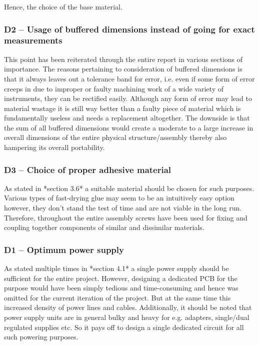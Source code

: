Hence, the choice of the base material.

\subsubsection*{D2 – Usage of buffered dimensions instead of going for exact measurements}

This point has been reiterated through the entire report in various sections of importance. The reasons pertaining to consideration of buffered dimensions is that it always leaves out a tolerance band for error, i.e. even if some form of error creeps in due to improper or faulty machining work of a wide variety of instruments, they can be rectified easily. Although any form of error may lead to material wastage it is still way better than a faulty piece of material which is fundamentally useless and needs a replacement altogether. The downside is that the sum of all buffered dimensions would create a moderate to a large increase in overall dimensions of the entire physical structure/assembly thereby also hampering its overall portability.

\subsubsection*{D3 – Choice of proper adhesive material}

As stated in *section 3.6* a suitable material should be chosen for such purposes. Various types of fast-drying glue may seem to be an intuitively easy option however, they don’t stand the test of time and are not viable in the long run. Therefore, throughout the entire assembly screws have been used for fixing and coupling together components of similar and dissimilar materials.

\subsubsection*{D1 – Optimum power supply}

As stated multiple times in *section 4.1* a single power supply should be sufficient for the entire project. However, designing a dedicated PCB for the purpose would have been simply tedious and time-consuming and hence was omitted for the current iteration of the project. But at the same time this increased density of power lines and cables. Additionally, it should be noted that power supply units are in general bulky and heavy for e.g. adapters, single/dual regulated supplies etc. So it pays off to design a single dedicated circuit for all such powering purposes.


